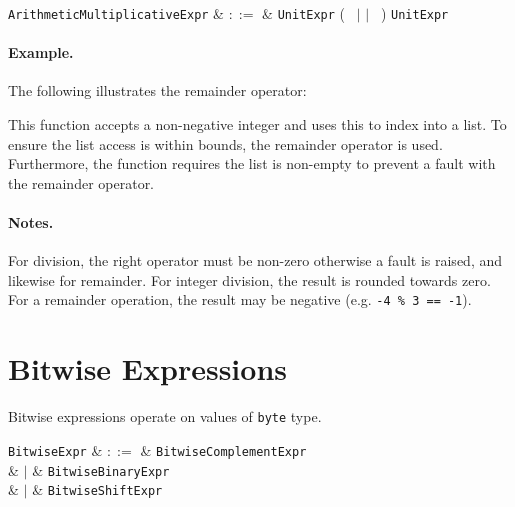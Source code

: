 \begin{syntax}
  \verb+ArithmeticMultiplicativeExpr+ & $::=$ & \verb+UnitExpr+ \big(\ \token{*} $|$ \token{/} $|$ \token{\%}\ \big) \verb+UnitExpr+\\
\end{syntax}

\paragraph{Example.} The following illustrates the remainder operator:



This function accepts a non-negative integer and uses this to index into a list.  To ensure the list access is within bounds, the remainder operator is used.  Furthermore, the function requires the list is non-empty to prevent a fault with the remainder operator.

\paragraph{Notes.}  For division, the right operator must be non-zero otherwise a \gls{fault} is raised, and likewise for remainder.  For integer division, the result is rounded towards zero.  For a remainder operation, the result may be negative (e.g. \lstinline{-4 % 3 == -1}).


\section{Bitwise Expressions}
\label{c_expr_bitwise}

Bitwise expressions operate on values of \lstinline{byte} type.

\begin{syntax}
  \verb+BitwiseExpr+ & $::=$ & \verb+BitwiseComplementExpr+\\
                  &  $|$  & \verb+BitwiseBinaryExpr+\\
                  &  $|$  & \verb+BitwiseShiftExpr+\\
\end{syntax}


